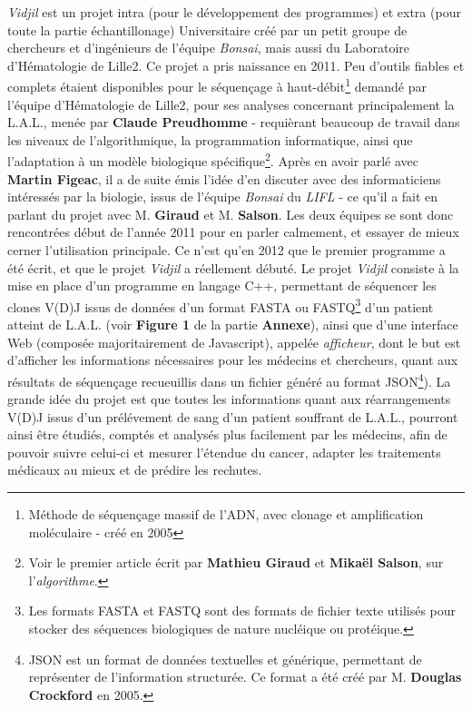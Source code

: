 \documentclass[pdftex,12pt,a4paper]{report}
\begin{document}
\begin{spacing}{1.2}
\textit{Vidjil} est un projet intra (pour le développement des programmes) et extra (pour toute la partie échantillonage) Universitaire créé par un petit groupe de chercheurs et d'ingénieurs de l'équipe \textit{Bonsai}, mais aussi du Laboratoire d'Hématologie de Lille2.
\newline
Ce projet a pris naissance en 2011. Peu d'outils fiables et complets étaient disponibles pour le séquençage à haut-débit\footnote{Méthode de séquençage massif de l'ADN, avec clonage et amplification moléculaire - créé en 2005} demandé par l'équipe d'Hématologie de Lille2, pour ses analyses concernant principalement la L.A.L., menée par \textbf{Claude Preudhomme} - requièrant beaucoup de travail dans les niveaux de l'algorithmique, la programmation informatique, ainsi que l'adaptation à un modèle biologique spécifique\footnote{Voir le premier article écrit par \textbf{Mathieu Giraud} et \textbf{Mikaël Salson}, sur l'\textit{algorithme}.}.
Après en avoir parlé avec \textbf{Martin Figeac}, il a de suite émis l'idée d'en discuter avec des informaticiens intéressés par la biologie, issus de l'équipe \textit{Bonsai} du \textit{LIFL} - ce qu'il a fait en parlant du projet avec M. \textbf{Giraud} et M. \textbf{Salson}.
Les deux équipes se sont donc rencontrées début de l'année 2011 pour en parler calmement, et essayer de mieux cerner l'utilisation principale. Ce n'est qu'en 2012 que le premier programme a été écrit, et que le projet \textit{Vidjil} a réellement débuté.
\newline
Le projet \textit{Vidjil} consiste à la mise en place d'un programme en langage C++, permettant de séquencer les clones V(D)J issus de données d'un format FASTA ou FASTQ\footnote{Les formats FASTA et FASTQ sont des formats de fichier texte utilisés pour stocker des séquences biologiques de nature nucléique ou protéique.} d'un patient atteint de L.A.L. (voir \textbf{Figure 1} de la partie \textbf{Annexe}), ainsi que d'une interface Web (composée majoritairement de Javascript), appelée \textit{afficheur}, dont le but est d'afficher les informations nécessaires pour les médecins et chercheurs, quant aux résultats de séquençage recueuillis dans un fichier généré au format JSON\footnote{JSON est un format de données textuelles et générique, permettant de représenter de l'information structurée. Ce format a été créé par M. \textbf{Douglas Crockford} en 2005.}).
La grande idée du projet est que toutes les informations quant aux réarrangements V(D)J issus d'un prélévement de sang d'un patient souffrant de L.A.L., pourront ainsi être étudiés, comptés et analysés plus facilement par les médecins, afin de pouvoir suivre celui-ci et mesurer l'étendue du cancer, adapter les traitements médicaux au mieux et de prédire les rechutes.


\end{spacing}
\end{document}

